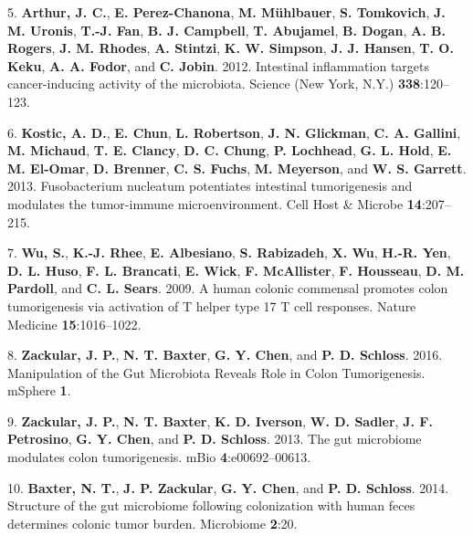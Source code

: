 \documentclass[12pt,]{article}
\begin{document}
\hypertarget{ref-arthur_intestinal_2012}{}
5. \textbf{Arthur, J. C.}, \textbf{E. Perez-Chanona}, \textbf{M.
Mühlbauer}, \textbf{S. Tomkovich}, \textbf{J. M. Uronis}, \textbf{T.-J.
Fan}, \textbf{B. J. Campbell}, \textbf{T. Abujamel}, \textbf{B. Dogan},
\textbf{A. B. Rogers}, \textbf{J. M. Rhodes}, \textbf{A. Stintzi},
\textbf{K. W. Simpson}, \textbf{J. J. Hansen}, \textbf{T. O. Keku},
\textbf{A. A. Fodor}, and \textbf{C. Jobin}. 2012. Intestinal
inflammation targets cancer-inducing activity of the microbiota. Science
(New York, N.Y.) \textbf{338}:120--123.

\hypertarget{ref-kostic_fusobacterium_2013}{}
6. \textbf{Kostic, A. D.}, \textbf{E. Chun}, \textbf{L. Robertson},
\textbf{J. N. Glickman}, \textbf{C. A. Gallini}, \textbf{M. Michaud},
\textbf{T. E. Clancy}, \textbf{D. C. Chung}, \textbf{P. Lochhead},
\textbf{G. L. Hold}, \textbf{E. M. El-Omar}, \textbf{D. Brenner},
\textbf{C. S. Fuchs}, \textbf{M. Meyerson}, and \textbf{W. S. Garrett}.
2013. Fusobacterium nucleatum potentiates intestinal tumorigenesis and
modulates the tumor-immune microenvironment. Cell Host \& Microbe
\textbf{14}:207--215.

\hypertarget{ref-wu_human_2009}{}
7. \textbf{Wu, S.}, \textbf{K.-J. Rhee}, \textbf{E. Albesiano},
\textbf{S. Rabizadeh}, \textbf{X. Wu}, \textbf{H.-R. Yen}, \textbf{D. L.
Huso}, \textbf{F. L. Brancati}, \textbf{E. Wick}, \textbf{F.
McAllister}, \textbf{F. Housseau}, \textbf{D. M. Pardoll}, and
\textbf{C. L. Sears}. 2009. A human colonic commensal promotes colon
tumorigenesis via activation of T helper type 17 T cell responses.
Nature Medicine \textbf{15}:1016--1022.

\hypertarget{ref-zackular_manipulation_2016}{}
8. \textbf{Zackular, J. P.}, \textbf{N. T. Baxter}, \textbf{G. Y. Chen},
and \textbf{P. D. Schloss}. 2016. Manipulation of the Gut Microbiota
Reveals Role in Colon Tumorigenesis. mSphere \textbf{1}.

\hypertarget{ref-zackular_gut_2013}{}
9. \textbf{Zackular, J. P.}, \textbf{N. T. Baxter}, \textbf{K. D.
Iverson}, \textbf{W. D. Sadler}, \textbf{J. F. Petrosino}, \textbf{G. Y.
Chen}, and \textbf{P. D. Schloss}. 2013. The gut microbiome modulates
colon tumorigenesis. mBio \textbf{4}:e00692--00613.

\hypertarget{ref-baxter_structure_2014}{}
10. \textbf{Baxter, N. T.}, \textbf{J. P. Zackular}, \textbf{G. Y.
Chen}, and \textbf{P. D. Schloss}. 2014. Structure of the gut microbiome
following colonization with human feces determines colonic tumor burden.
Microbiome \textbf{2}:20.
\end{document}
